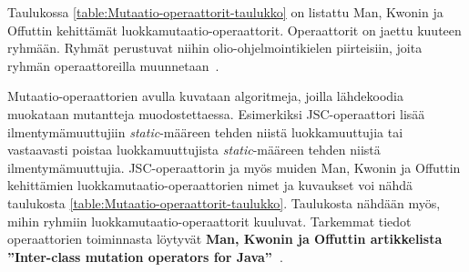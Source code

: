 \documentclass[finnish, grading]{tktltiki2}
\theoremstyle{definition}
\theoremstyle{remark}
\begin{document}
Taulukossa \ref{table:Mutaatio-operaattorit-taulukko} on listattu Man, Kwonin ja Offuttin kehittämät luok\-ka\-mu\-taa\-ti\-o-o\-pe\-raat\-to\-rit. Operaattorit on jaettu kuuteen ryhmään. Ryhmät perustuvat niihin olio-ohjelmointikielen piirteisiin, joita ryhmän operaattoreilla muunnetaan~\cite[s. 355]{Ma:Kwon:Offutt:2002}.

Mutaatio-operaattorien avulla kuvataan algoritmeja, joilla lähdekoodia muokataan mutantteja muodostettaessa. Esimerkiksi JSC-operaattori lisää ilmentymämuuttujiin \textit{static}-määreen tehden niistä luokkamuuttujia tai vastaavasti poistaa luokkamuuttujista \textit{static}-määreen tehden niistä ilmentymämuuttujia. JSC-operaattorin ja myös muiden Man, Kwonin ja Offuttin kehittämien luokkamutaatio-operaattorien nimet ja kuvaukset voi nähdä taulukosta \ref{table:Mutaatio-operaattorit-taulukko}. Taulukosta nähdään myös, mihin ryhmiin luokkamutaatio-operaattorit kuuluvat. Tarkemmat tiedot operaattorien toiminnasta löytyvät \textbf{Man, Kwonin ja Offuttin artikkelista ''Inter-class mutation operators for Java''~\cite{Ma:Kwon:Offutt:2002}}. 
\end{document}
